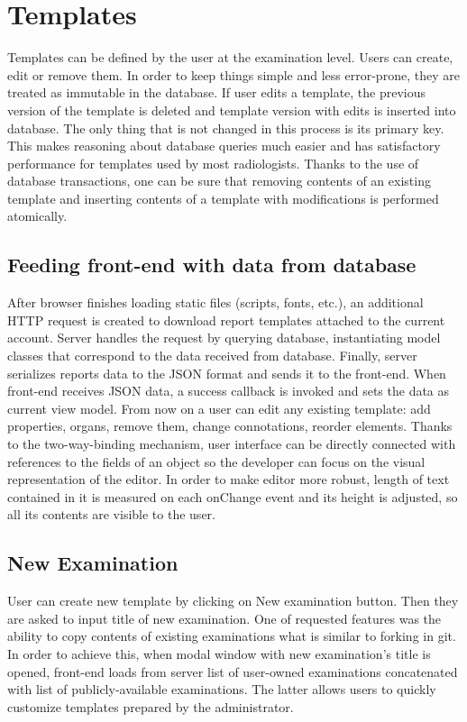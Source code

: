 \documentclass[12pt, twoside, openany]{report}
\theoremstyle{definition}
\begin{document}
\section{Templates}
Templates can be defined by the user at the examination level. Users can create, edit or remove them. In order to keep things simple and less error-prone, they are treated as immutable in the database. If user edits a template, the previous version of the template is deleted and template version with edits is inserted into database. The only thing that is not changed in this process is its primary key. This makes reasoning about database queries much easier and has satisfactory performance for templates used by most radiologists. Thanks to the use of database transactions, one can be sure that removing contents of an existing template and inserting contents of a template with modifications is performed atomically.


\subsection{Feeding front-end with data from database}\label{templates-immutable}
After browser finishes loading static files (scripts, fonts, etc.), an additional HTTP request is created to download report templates attached to the current account. Server handles the request by querying database, instantiating model classes that correspond to the data received from database. Finally, server serializes reports data to the JSON format and sends it to the front-end. When front-end receives JSON data, a success callback is invoked and sets the data as current view model. 
From now on a user can edit any existing template: add properties, organs, remove them, change connotations, reorder elements. Thanks to the two-way-binding mechanism, user interface can be directly connected with references to the fields of an object so the developer can focus on the visual representation of the editor. In order to make editor more robust, length of text contained in it is measured on each onChange event and its height is adjusted, so all its contents are visible to the user.
\subsection{New Examination}
User can create new template by clicking on New examination button. Then they are asked to input title of new examination. One of requested features was the ability to copy contents of existing examinations what is similar to forking in git. In order to achieve this, when modal window with new examination's title is opened, front-end loads from server list of user-owned examinations concatenated with list of publicly-available examinations. The latter allows users to quickly customize templates prepared by the administrator.
\end{document}
